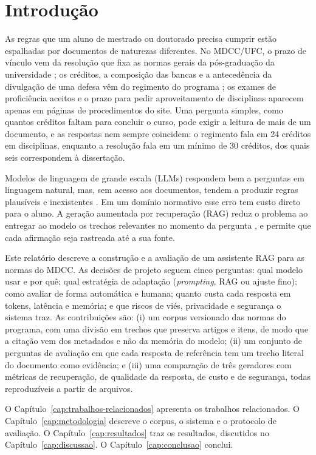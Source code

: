 \chapter{Introdução}
\label{cap:introducao}

As regras que um aluno de mestrado ou doutorado precisa cumprir estão espalhadas por
documentos de naturezas diferentes. No MDCC/UFC, o prazo de vínculo vem da resolução
que fixa as normas gerais da pós-graduação da universidade \cite{UFC2015}; os créditos,
a composição das bancas e a antecedência da divulgação de uma defesa vêm do regimento
do programa \cite{MDCC2016}; os exames de proficiência aceitos e o prazo para pedir
aproveitamento de disciplinas aparecem apenas em páginas de procedimentos do site. Uma
pergunta simples, como quantos créditos faltam para concluir o curso, pode exigir a
leitura de mais de um documento, e as respostas nem sempre coincidem: o regimento fala
em 24 créditos em disciplinas, enquanto a resolução fala em um mínimo de 30 créditos,
dos quais seis correspondem à dissertação.

Modelos de linguagem de grande escala (LLMs) respondem bem a perguntas em linguagem
natural, mas, sem acesso aos documentos, tendem a produzir regras plausíveis e
inexistentes \cite{Ji2023}. Em um domínio normativo esse erro tem custo direto para o
aluno. A geração aumentada por recuperação (RAG) reduz o problema ao entregar ao modelo
os trechos relevantes no momento da pergunta \cite{Lewis2020,Gao2023}, e permite que
cada afirmação seja rastreada até a sua fonte.

Este relatório descreve a construção e a avaliação de um assistente RAG para as normas do MDCC. As decisões
de projeto seguem cinco perguntas: qual modelo usar e por quê; qual estratégia de
adaptação (\textit{prompting}, RAG ou ajuste fino); como avaliar de forma automática e
humana; quanto custa cada resposta em tokens, latência e memória; e que riscos de
viés, privacidade e segurança o sistema traz. As contribuições são:
(i) um corpus versionado das normas do programa, com uma divisão em trechos que
preserva artigos e itens, de modo que a citação vem dos metadados e não da memória do
modelo; (ii) um conjunto de perguntas de avaliação em que cada resposta de referência
tem um trecho literal do documento como evidência; e (iii) uma comparação de três
geradores com métricas de recuperação, de qualidade da resposta, de custo e de
segurança, todas reproduzíveis a partir de arquivos.

O Capítulo~\ref{cap:trabalhos-relacionados} apresenta os trabalhos relacionados. O
Capítulo~\ref{cap:metodologia} descreve o corpus, o sistema e o protocolo de avaliação. O
Capítulo~\ref{cap:resultados} traz os resultados, discutidos no
Capítulo~\ref{cap:discussao}. O Capítulo~\ref{cap:conclusao} conclui.
